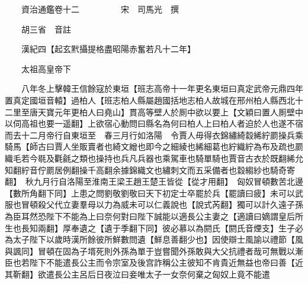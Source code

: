 










 


 
 


 

  
  
  
  
  





  
  
  
  
  
 
  

  

  
  
  



  

 
 

  
   




  

  
  


  　　資治通鑑卷十二　　　　　宋　司馬光　撰

　　胡三省　音註

　　漢紀四【起玄黓攝提格盡昭陽赤奮若凡十二年】

　　太祖高皇帝下

　　八年冬上擊韓王信餘寇於東垣【班志高帝十一年更名東垣曰真定武帝元鼎四年置真定國垣音轅】過柏人【班志柏人縣屬趙國括地志柏人故城在邢州柏人縣西北十二里至唐天寶元年更柏人曰堯山】貫高等壁人於厠中欲以要上【文穎曰置人厠壁中以伺高祖也要一遥翻】上欲宿心動問曰縣名為何曰柏人上曰柏人者迫於人也遂不宿而去十二月帝行自東垣至　春三月行如洛陽　令賈人毋得衣錦繡綺縠絺紵罽操兵乘騎馬【師古曰賈人坐販賣者也綺文繒也即今之細綾也絺細葛也紵織紵為布及疏也罽織毛若今毼及氍毹之類也操持也兵凡兵器也乘駕車也騎單騎也賈音古衣於既翻絺允知翻紵音佇罽居例翻操千高翻余據錦織文也繡刺文而五采備者也縠縐紗也騎奇寄翻】　秋九月行自洛陽至淮南王梁王趙王楚王皆從【從才用翻】　匈奴冒頓數苦北邊【數所角翻下同】上患之問劉敬劉敬曰天下初定士卒罷於兵【罷讀曰疲】未可以武服也冒頓殺父代立妻羣母以力為威未可以仁義說也【說式芮翻】獨可以計久遠子孫為臣耳然恐陛下不能為上曰奈何對曰陛下誠能以適長公主妻之【適讀曰嫡謂皇后所生也長知兩翻】厚奉遺之【遺于季翻下同】彼必慕以為閼氏【閼氏音煙支】生子必為太子陛下以歲時漢所餘彼所鮮數問遺【鮮息善翻少也】因使辯士風諭以禮節【風與諷同】冒頓在固為子壻死則外孫為單于豈嘗聞外孫敢與大父抗禮者哉可無戰以漸臣也若陛下不能遣長公主而令宗室及後宫詐稱公主彼知不肯貴近無益也帝曰善【近其靳翻】欲遣長公主呂后日夜泣曰妾唯太子一女奈何棄之匈奴上竟不能遣

